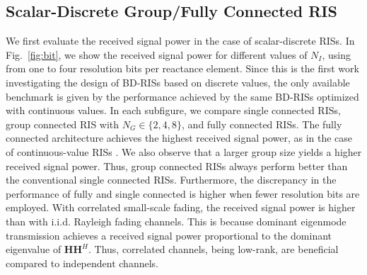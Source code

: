 \documentclass[twocolumn,10pt]{IEEEtran}
\begin{document}
\subsection{Scalar-Discrete Group/Fully Connected RIS}

We first evaluate the received signal power in the case of scalar-discrete RISs.
In Fig.~\ref{fig:bit}, we show  the received signal power for different values of $N_{I}$, using from one to four resolution bits per reactance element.
Since this is the first work investigating the design of BD-RISs based on discrete values, the only available benchmark is given by the performance achieved by the same BD-RISs optimized with continuous values.
In each subfigure, we compare single connected RISs, group connected RIS with $N_{G}\in\{2,4,8\}$, and fully connected RISs.
The fully connected architecture achieves the highest received signal power, as in the case of continuous-value RISs \cite{she20}.
We also observe that a larger group size yields a higher received signal power.
Thus, group connected RISs always perform better than the conventional single connected RISs.
Furthermore, the discrepancy in the performance of fully and single connected is higher when fewer resolution bits are employed.
With correlated small-scale fading, the received signal power is higher than with i.i.d. Rayleigh fading channels.
This is because dominant eigenmode transmission achieves a received signal power proportional to the dominant eigenvalue of $\mathbf{H}\mathbf{H}^H$.
Thus, correlated channels, being low-rank, are beneficial compared to independent channels.
\end{document}

